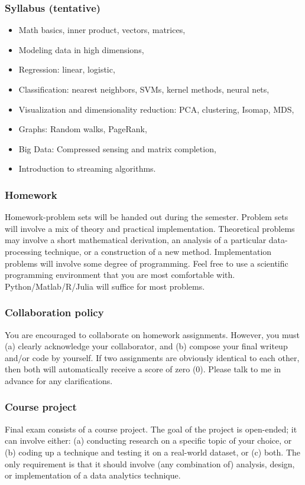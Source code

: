\documentclass[11pt,twoside]{article}
\begin{document}
\subsubsection*{Syllabus (tentative)}

\begin{itemize}[noitemsep,nolistsep]
  \item Math basics, inner product, vectors, matrices,
  \item Modeling data in high dimensions,
  \item Regression: linear, logistic,
  \item Classification: nearest neighbors, SVMs, kernel methods, neural 
    nets,
  \item Visualization and dimensionality reduction: PCA, clustering, Isomap, 
    MDS,
  \item Graphs: Random walks, PageRank,
  \item Big Data: Compressed sensing and matrix completion,
  \item Introduction to streaming algorithms.
\end{itemize}

\subsubsection*{Homework}
Homework-problem sets will be handed out during the semester. Problem sets 
will involve a mix of theory and practical implementation. Theoretical 
problems may involve a short mathematical derivation,  an analysis of a 
particular data-processing technique, or a construction of a new method. 
Implementation problems will involve some degree of programming. Feel free 
to use a scientific programming environment that you are most comfortable 
with. Python/Matlab/R/Julia   will suffice for most problems.

\subsubsection*{Collaboration policy}
You are encouraged to collaborate on homework assignments. However, you 
must (a) {clearly acknowledge your collaborator}, and (b) compose your 
final writeup and/or code by yourself.  If two assignments are obviously 
identical to each other, then {both} will automatically receive a score of 
zero (0). Please talk to me in advance for any clarifications.

\subsubsection*{Course project}
Final exam consists of a course project. The goal of the project is open-ended; 
it can involve either: (a) conducting research on a specific topic of your 
choice, or (b) coding up a technique and testing it on a real-world dataset, or 
(c) both. The only requirement is that it should involve (any combination of) 
analysis, design, or implementation of a data analytics technique. 
\end{document}
